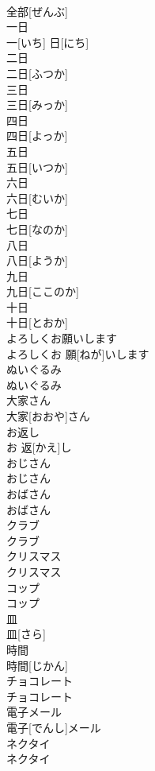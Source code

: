 \documentclass[8pt]{extreport}
\begin{document}
\begin{CJK}{UTF8}{min}
\\	全部[ぜんぶ]
\\	一日 
\\	一[いち] 日[にち]
\\	二日 
\\	二日[ふつか]
\\	三日 
\\	三日[みっか]　
\\	四日 
\\	四日[よっか] 
\\	五日 
\\	五日[いつか]
\\	六日 
\\	六日[むいか]
\\	七日 
\\	七日[なのか]
\\	八日 
\\	八日[ようか]
\\	九日 
\\	九日[ここのか]
\\	十日 
\\	十日[とおか]
\\	よろしくお願いします	
\\	よろしくお 願[ねが]いします
\\	ぬいぐるみ	
\\	ぬいぐるみ
\\	大家さん	
\\	大家[おおや]さん
\\	お返し	
\\	お 返[かえ]し
\\	おじさん	
\\	おじさん
\\	おばさん	
\\	おばさん
\\	クラブ	
\\	クラブ
\\	クリスマス	
\\	クリスマス
\\	コップ	
\\	コップ
\\	皿	
\\	皿[さら]
\\	時間	
\\	時間[じかん]
\\	チョコレート	
\\	チョコレート
\\	電子メール	
\\	電子[でんし]メール
\\	ネクタイ	
\\	ネクタイ

\end{CJK}
\end{document}

